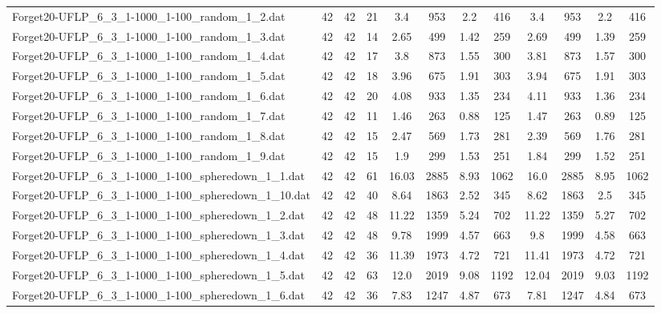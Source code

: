 \begin{sidewaystable}[!ht]
{\begin{tabular}{lccccccccccc}
Forget20-UFLP\_6\_3\_1-1000\_1-100\_random\_1\_2.dat & 42 & 42 & 21 & 3.4 & 953 &  \textcolor{blue2}{2.2} & 416 & 3.4 & 953 &  \textcolor{blue2}{2.2} & 416 \\
Forget20-UFLP\_6\_3\_1-1000\_1-100\_random\_1\_3.dat & 42 & 42 & 14 & 2.65 & 499 & 1.42 & 259 & 2.69 & 499 &  \textcolor{blue2}{1.39} & 259 \\
Forget20-UFLP\_6\_3\_1-1000\_1-100\_random\_1\_4.dat & 42 & 42 & 17 & 3.8 & 873 &  \textcolor{blue2}{1.55} & 300 & 3.81 & 873 & 1.57 & 300 \\
Forget20-UFLP\_6\_3\_1-1000\_1-100\_random\_1\_5.dat & 42 & 42 & 18 & 3.96 & 675 & 1.91 & 303 & 3.94 & 675 & 1.91 & 303 \\
Forget20-UFLP\_6\_3\_1-1000\_1-100\_random\_1\_6.dat & 42 & 42 & 20 & 4.08 & 933 &  \textcolor{blue2}{1.35} & 234 & 4.11 & 933 & 1.36 & 234 \\
Forget20-UFLP\_6\_3\_1-1000\_1-100\_random\_1\_7.dat & 42 & 42 & 11 & 1.46 & 263 &  \textcolor{blue2}{0.88} & 125 & 1.47 & 263 & 0.89 & 125 \\
Forget20-UFLP\_6\_3\_1-1000\_1-100\_random\_1\_8.dat & 42 & 42 & 15 & 2.47 & 569 &  \textcolor{blue2}{1.73} & 281 & 2.39 & 569 & 1.76 & 281 \\
Forget20-UFLP\_6\_3\_1-1000\_1-100\_random\_1\_9.dat & 42 & 42 & 15 & 1.9 & 299 & 1.53 & 251 & 1.84 & 299 &  \textcolor{blue2}{1.52} & 251 \\
Forget20-UFLP\_6\_3\_1-1000\_1-100\_spheredown\_1\_1.dat & 42 & 42 & 61 & 16.03 & 2885 &  \textcolor{blue2}{8.93} & 1062 & 16.0 & 2885 & 8.95 & 1062 \\
Forget20-UFLP\_6\_3\_1-1000\_1-100\_spheredown\_1\_10.dat & 42 & 42 & 40 & 8.64 & 1863 & 2.52 & 345 & 8.62 & 1863 &  \textcolor{blue2}{2.5} & 345 \\
Forget20-UFLP\_6\_3\_1-1000\_1-100\_spheredown\_1\_2.dat & 42 & 42 & 48 & 11.22 & 1359 &  \textcolor{blue2}{5.24} & 702 & 11.22 & 1359 & 5.27 & 702 \\
Forget20-UFLP\_6\_3\_1-1000\_1-100\_spheredown\_1\_3.dat & 42 & 42 & 48 & 9.78 & 1999 & 4.57 & 663 & 9.8 & 1999 & 4.58 & 663 \\
Forget20-UFLP\_6\_3\_1-1000\_1-100\_spheredown\_1\_4.dat & 42 & 42 & 36 & 11.39 & 1973 & 4.72 & 721 & 11.41 & 1973 & 4.72 & 721 \\
Forget20-UFLP\_6\_3\_1-1000\_1-100\_spheredown\_1\_5.dat & 42 & 42 & 63 & 12.0 & 2019 & 9.08 & 1192 & 12.04 & 2019 &  \textcolor{blue2}{9.03} & 1192 \\
Forget20-UFLP\_6\_3\_1-1000\_1-100\_spheredown\_1\_6.dat & 42 & 42 & 36 & 7.83 & 1247 & 4.87 & 673 & 7.81 & 1247 &  \textcolor{blue2}{4.84} & 673 \\

\end{tabular}}
\end{sidewaystable}
